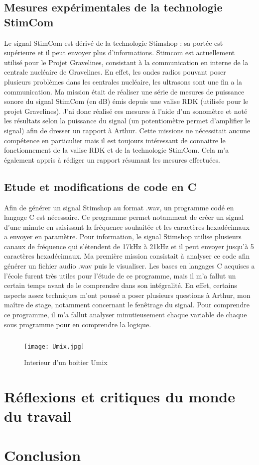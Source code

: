 \documentclass[12pt]{report}
\begin{document}
	\section{Mesures expérimentales de la technologie StimCom}

Le signal StimCom est dérivé de la technologie Stimshop : sa portée est supérieure et il peut envoyer plus d'informations. Stimcom est actuellement utilisé pour le Projet Gravelines, consistant à la communication en interne de la centrale nucléaire de Gravelines. En effet, les ondes radios pouvant poser plusieurs problèmes dans les centrales nucléaire, les ultrasons sont une fin a la communication. 
Ma mission était de réaliser une série de mesures de puissance sonore du signal StimCom (en dB) émis depuis une valise RDK (utilisée pour le projet Gravelines). J'ai donc réalisé ces mesures à l'aide d'un sonomètre et noté les résultats selon la puissance du signal (un potentiomètre permet d'amplifier le signal) afin de dresser un rapport à Arthur. 
Cette missions ne nécessitait aucune compétence en particulier mais il est toujours intéressant de connaitre le fonctionnement de la valise RDK et de la technologie StimCom. Cela m'a également appris à rédiger un rapport résumant les mesures effectuées. 

	\section{Etude et modifications de code en C} 

Afin de générer un signal Stimshop au format .wav, un programme codé en langage C est nécessaire. Ce programme permet notamment de créer un signal d'une minute en saisissant la fréquence souhaitée et les caractères hexadécimaux a envoyer en paramètre. Pour information, le signal Stimshop utilise plusieurs canaux de fréquence qui s'étendent de 17kHz à 21kHz et il peut envoyer jusqu'à 5 caractères hexadécimaux.  
Ma première mission consistait à analyser ce code afin générer un fichier audio .wav puis le visualiser. Les bases en langages C acquises a l'école furent très utiles pour l'étude de ce programme, mais il m'a fallut un certain temps avant de le comprendre dans son intégralité. En effet, certains aspects assez techniques m'ont poussé a poser plusieurs questions à Arthur, mon maître de stage, notamment concernant le fenêtrage du signal. Pour comprendre ce programme, il m'a fallut analyser minutieusement chaque variable de chaque sous programme pour en comprendre la logique. 

\paragraph{}



\begin{figure}
\begin{center}
\texttt{[image: Umix.jpg]}
\end{center}
\caption{Interieur d'un boitier Umix}
\label{Interieur d'un boitier Umix}
\end{figure}


\chapter{Réflexions et critiques du monde du travail}
\chapter*{Conclusion}
\end{document}
